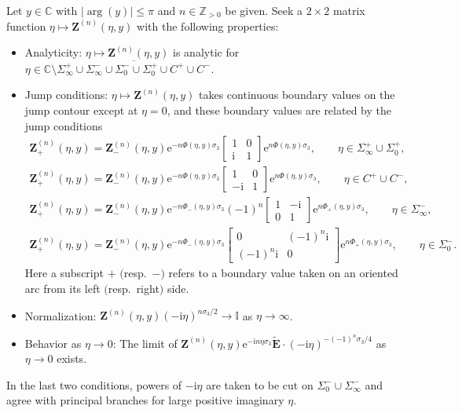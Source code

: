 \begin{rhp}\label{rhp:Z}
Let $y\in\mathbb{C}$ with $|\arg(y)|\le\pi$ and $n\in\mathbb{Z}_{>0}$ be given. Seek a $2\times 2$ matrix function $\eta\mapsto\mathbf{Z}^{(n)}(\eta,y)$ with the following properties:
\begin{itemize}\itemsep=0pt
\item[]Analyticity: $\eta\mapsto\mathbf{Z}^{(n)}(\eta,y)$ is analytic for $\eta\in\mathbb{C}\setminus \overline{\Sigma_\infty^+\cup\Sigma_\infty^-\cup\Sigma_0^-\cup\Sigma_0^+\cup C^+\cup C^-}$.
\item[]Jump conditions: $\eta\mapsto \mathbf{Z}^{(n)}(\eta,y)$ takes continuous boundary values on the jump contour except at $\eta=0$, and these boundary values are related by the jump conditions
\begin{gather*}
\mathbf{Z}_+^{(n)}(\eta,y)=\mathbf{Z}^{(n)}_-(\eta,y)\mathrm{e}^{-n\Phi(\eta,y)\sigma_3}\begin{bmatrix}1&0\\\mathrm{i} & 1\end{bmatrix}\mathrm{e}^{n\Phi(\eta,y)\sigma_3},\qquad\eta\in\Sigma_\infty^+\cup\Sigma_0^+,
\\
\mathbf{Z}_+^{(n)}(\eta,y)=\mathbf{Z}^{(n)}_-(\eta,y)\mathrm{e}^{-n\Phi(\eta,y)\sigma_3}\begin{bmatrix}1&0\\-\mathrm{i} & 1\end{bmatrix}\mathrm{e}^{n\Phi(\eta,y)\sigma_3},\qquad\eta\in C^+\cup C^-,
\\
\mathbf{Z}_+^{(n)}(\eta,y)=\mathbf{Z}^{(n)}_-(\eta,y)\mathrm{e}^{-n\Phi_-(\eta,y)\sigma_3}(-1)^n\begin{bmatrix}1&-\mathrm{i} \\ 0 & 1\end{bmatrix}\mathrm{e}^{n\Phi_+(\eta,y)\sigma_3},\qquad\eta\in\Sigma_\infty^-,
\\
\mathbf{Z}_+^{(n)}(\eta,y)=\mathbf{Z}^{(n)}_-(\eta,y)\mathrm{e}^{-n\Phi_-(\eta,y)\sigma_3}\begin{bmatrix}0 & (-1)^n\mathrm{i}\\ (-1)^n\mathrm{i} & 0\end{bmatrix}
\mathrm{e}^{n\Phi_+(\eta,y)\sigma_3},\qquad\eta\in\Sigma_0^-.
\end{gather*}
Here a subscript $+$ $($resp.~$-)$ refers to a
boundary value taken on an oriented arc from its left $($resp.\ right$)$ side.
\item[]Normalization: $\mathbf{Z}^{(n)}(\eta,y)(-\mathrm{i}\eta)^{n\sigma_3/2}\to\mathbb{I}$ as $\eta\to\infty$.
\item[]Behavior as $\eta\to 0$: The limit of $\mathbf{Z}^{(n)}(\eta,y)\mathrm{e}^{-\mathrm{i} n\eta\sigma_3}\widetilde{\mathbf{E}}\cdot(-\mathrm{i}\eta)^{-(-1)^n\sigma_3/4}$ as $\eta\to 0$ exists.
\end{itemize}
In the last two conditions, powers of $-\mathrm{i}\eta$ are taken to be cut on $\Sigma_0^-\cup\Sigma_\infty^-$ and agree with principal branches for large positive imaginary $\eta$.
\end{rhp}

